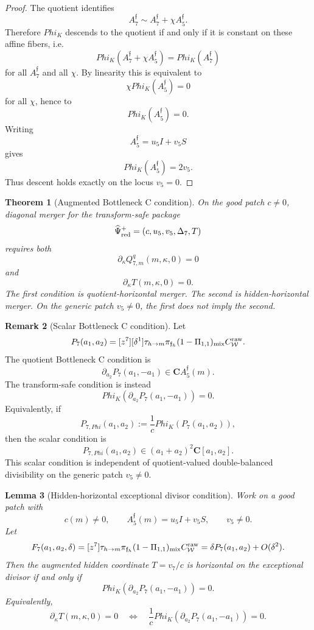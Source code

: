 \documentclass[11pt,a4paper]{amsart}
\def\Phi{Phi}%
\theoremstyle{plain}
\newtheorem{theorem}{Theorem}[section]
\newtheorem{lemma}[theorem]{Lemma}
\theoremstyle{definition}
\newtheorem{remark}[theorem]{Remark}
\begin{document}
\begin{proof}
The quotient identifies
\[
A_7^{\mathfrak f}
\sim
A_7^{\mathfrak f}+\chi A_5^{\mathfrak f}.
\]
Therefore \(\Phi_K\) descends to the quotient if and only if it is constant on
these affine fibers, i.e.
\[
\Phi_K(A_7^{\mathfrak f}+\chi A_5^{\mathfrak f})
=
\Phi_K(A_7^{\mathfrak f})
\]
for all \(A_7^{\mathfrak f}\) and all \(\chi\).  By linearity this is
equivalent to
\[
\chi\Phi_K(A_5^{\mathfrak f})=0
\]
for all \(\chi\), hence to
\[
\Phi_K(A_5^{\mathfrak f})=0.
\]
Writing
\[
A_5^{\mathfrak f}=u_5I+v_5S
\]
gives
\[
\Phi_K(A_5^{\mathfrak f})=2v_5.
\]
Thus descent holds exactly on the locus \(v_5=0\).
\end{proof}

\begin{theorem}[Augmented Bottleneck C condition]
\label{thm:augmented-bottleneck-c-condition}
On the good patch \(c\ne0\), diagonal merger for the transform-safe package
\[
\widehat\Psi_{\rm red}^{+}
=
(c,u_5,v_5,\Delta_7,T)
\]
requires both
\[
\partial_\kappa Q_{7,m}^q(m,\kappa,0)=0
\]
and
\[
\partial_\kappa T(m,\kappa,0)=0.
\]
The first condition is quotient-horizontal merger.  The second is
hidden-horizontal merger.  On the generic patch \(v_5\ne0\), the first does
not imply the second.
\end{theorem}

\begin{remark}[Scalar Bottleneck C condition]
\label{rem:scalar-bottleneck-c-condition}
Let
\[
P_7(a_1,a_2)
=
[z^7][\delta^1]\tau_{h\to m}\pi_{\mathfrak f_h}
(1-\Pi_{1,1})_{\rm mix}C_{\mathcal W}^{\rm raw}.
\]
The quotient Bottleneck C condition is
\[
\partial_{a_2}P_7(a_1,-a_1)
\in
\mathbf C A_5^{\mathfrak f}(m).
\]
The transform-safe condition is instead
\[
\Phi_K\!\left(\partial_{a_2}P_7(a_1,-a_1)\right)=0.
\]
Equivalently, if
\[
P_{7,\Phi}(a_1,a_2)
:=
\frac{1}{c}\Phi_K(P_7(a_1,a_2)),
\]
then the scalar condition is
\[
P_{7,\Phi}(a_1,a_2)
\in
(a_1+a_2)^2\mathbf C[a_1,a_2].
\]
This scalar condition is independent of quotient-valued double-balanced
divisibility on the generic patch \(v_5\ne0\).
\end{remark}

\begin{lemma}[Hidden-horizontal exceptional divisor condition]
\label{lem:hidden-horizontal-exceptional-divisor-condition}
Work on a good patch with
\[
c(m)\ne0,\qquad
A_5^{\mathfrak f}(m)=u_5I+v_5S,\qquad
v_5\ne0.
\]
Let
\[
F_7(a_1,a_2,\delta)
=
[z^7]\tau_{h\to m}\pi_{\mathfrak f_h}
(1-\Pi_{1,1})_{\rm mix}C_{\mathcal W}^{\rm raw}
=
\delta P_7(a_1,a_2)+O(\delta^2).
\]
Then the augmented hidden coordinate \(T=v_7/c\) is horizontal on the
exceptional divisor if and only if
\[
\Phi_K\!\left(
\partial_{a_2}P_7(a_1,-a_1)
\right)=0.
\]
Equivalently,
\[
\partial_\kappa T(m,\kappa,0)=0
\quad\Longleftrightarrow\quad
\frac1c
\Phi_K\!\left(
\partial_{a_2}P_7(a_1,-a_1)
\right)=0.
\]
\end{lemma}
\end{document}

